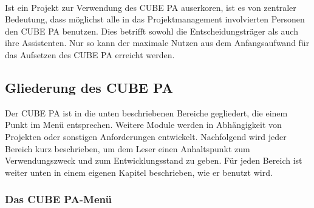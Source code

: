 \ \\
Ist ein Projekt zur Verwendung des CUBE PA auserkoren, ist es von zentraler Bedeutung, dass möglichst alle in das Projektmanagement involvierten Personen den CUBE PA benutzen. Dies betrifft sowohl die Entscheidungsträger als auch ihre Assistenten. Nur so kann der maximale Nutzen aus dem Anfangsaufwand für das Aufsetzen des CUBE PA erreicht werden.
	
\subsection{Gliederung des CUBE PA} %

Der CUBE PA ist in die unten beschriebenen Bereiche gegliedert, die einem Punkt im Menü entsprechen. Weitere Module werden in Abhängigkeit von Projekten oder sonstigen Anforderungen entwickelt. Nachfolgend wird jeder Bereich kurz beschrieben, um dem Leser einen Anhaltspunkt zum Verwendungszweck und zum Entwicklungsstand zu geben. Für jeden Bereich ist weiter unten in einem eigenen Kapitel beschrieben, wie er benutzt wird.

\pagebreak
\subsubsection{Das CUBE PA-Menü} %

\setlength{\abovecaptionskip}{0pt}


